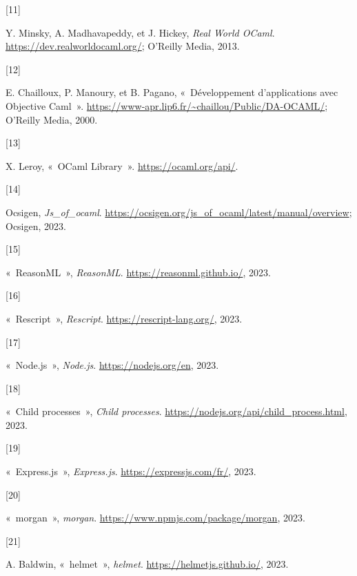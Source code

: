 \documentclass[
  12pt,
]{article}
\newlength{\cslhangindent}
\newlength{\csllabelwidth}
\newlength{\cslentryspacingunit} %
\newenvironment{CSLReferences}[2] %
 {%
  \setlength{\parindent}{0pt}
  \ifodd #1
  \let\oldpar\par
  \def\par{\hangindent=\cslhangindent\oldpar}
  \fi
  \setlength{\parskip}{#2\cslentryspacingunit}
 }%
 {}
\newcommand{\CSLLeftMargin}[1]{\parbox[t]{\csllabelwidth}{#1}}
\newcommand{\CSLRightInline}[1]{\parbox[t]{\linewidth - \csllabelwidth}{#1}\break}
\begin{document}
\begin{CSLReferences}{0}{0}
  \leavevmode{}%
  \CSLLeftMargin{{[}11{]} }%
  \CSLRightInline{Y. Minsky, A. Madhavapeddy, et J. Hickey, \emph{Real
      World OCaml}. \url{https://dev.realworldocaml.org/}; O'Reilly Media,
    2013.}

  \leavevmode{}%
  \CSLLeftMargin{{[}12{]} }%
  \CSLRightInline{E. Chailloux, P. Manoury, et B. Pagano, {«~Développement
        d'applications avec Objective Caml~»}.
    \url{https://www-apr.lip6.fr/~chaillou/Public/DA-OCAML/}; O'Reilly
    Media, 2000.}

  \leavevmode{}%
  \CSLLeftMargin{{[}13{]} }%
  \CSLRightInline{X. Leroy, {«~OCaml Library~»}.
    \url{https://ocaml.org/api/}.}

  \leavevmode{}%
  \CSLLeftMargin{{[}14{]} }%
  \CSLRightInline{Ocsigen, \emph{Js\_of\_ocaml}.
    \url{https://ocsigen.org/js_of_ocaml/latest/manual/overview}; Ocsigen,
    2023.}

  \leavevmode{}%
  \CSLLeftMargin{{[}15{]} }%
  \CSLRightInline{{«~ReasonML~»}, \emph{ReasonML}.
    \url{https://reasonml.github.io/}, 2023.}

  \leavevmode{}%
  \CSLLeftMargin{{[}16{]} }%
  \CSLRightInline{{«~Rescript~»}, \emph{Rescript}.
    \url{https://rescript-lang.org/}, 2023.}

  \leavevmode{}%
  \CSLLeftMargin{{[}17{]} }%
  \CSLRightInline{{«~Node.js~»}, \emph{Node.js}.
    \url{https://nodejs.org/en}, 2023.}

  \leavevmode{}%
  \CSLLeftMargin{{[}18{]} }%
  \CSLRightInline{{«~Child processes~»}, \emph{Child processes}.
    \url{https://nodejs.org/api/child_process.html}, 2023.}

  \leavevmode{}%
  \CSLLeftMargin{{[}19{]} }%
  \CSLRightInline{{«~Express.js~»}, \emph{Express.js}.
    \url{https://expressjs.com/fr/}, 2023.}

  \leavevmode{}%
  \CSLLeftMargin{{[}20{]} }%
  \CSLRightInline{{«~morgan~»}, \emph{morgan}.
    \url{https://www.npmjs.com/package/morgan}, 2023.}

  \leavevmode{}%
  \CSLLeftMargin{{[}21{]} }%
  \CSLRightInline{A. Baldwin, {«~helmet~»}, \emph{helmet}.
    \url{https://helmetjs.github.io/}, 2023.}


\end{CSLReferences}
\end{document}
